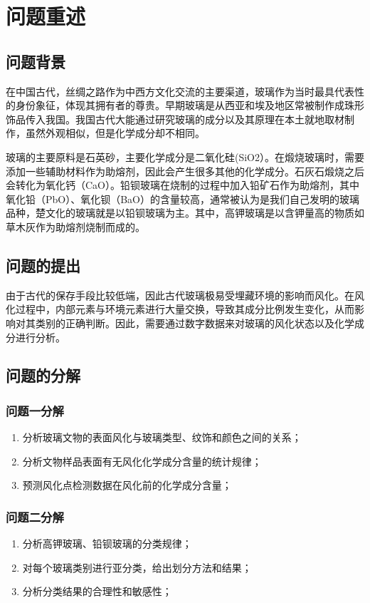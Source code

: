 \section{问题重述}
\subsection{问题背景}
在中国古代，丝绸之路作为中西方文化交流的主要渠道，玻璃作为当时最具代表性的身份象征，体现其拥有者的尊贵。早期玻璃是从西亚和埃及地区常被制作成珠形饰品传入我国。我国古代大能通过研究玻璃的成分以及其原理在本土就地取材制作，虽然外观相似，但是化学成分却不相同。

玻璃的主要原料是石英砂，主要化学成分是二氧化硅(SiO2）。在煅烧玻璃时，需要添加一些辅助材料作为助熔剂，因此会产生很多其他的化学成分。石灰石煅烧之后会转化为氧化钙（CaO）。铅钡玻璃在烧制的过程中加入铅矿石作为助熔剂，其中氧化铅（PbO）、氧化钡（BaO）的含量较高，通常被认为是我们自己发明的玻璃品种，楚文化的玻璃就是以铅钡玻璃为主。其中，高钾玻璃是以含钾量高的物质如草木灰作为助熔剂烧制而成的。

\subsection{问题的提出}
由于古代的保存手段比较低端，因此古代玻璃极易受埋藏环境的影响而风化。在风化过程中，内部元素与环境元素进行大量交换，导致其成分比例发生变化，从而影响对其类别的正确判断。因此，需要通过数字数据来对玻璃的风化状态以及化学成分进行分析。

\subsection{问题的分解}
\subsubsection{问题一分解}
\begin{enumerate}
	\item 分析玻璃文物的表面风化与玻璃类型、纹饰和颜色之间的关系；
	\item 分析文物样品表面有无风化化学成分含量的统计规律；
	\item 预测风化点检测数据在风化前的化学成分含量；
\end{enumerate}

\subsubsection{问题二分解}
\begin{enumerate}
	\item 分析高钾玻璃、铅钡玻璃的分类规律；
	\item 对每个玻璃类别进行亚分类，给出划分方法和结果；
	\item 分析分类结果的合理性和敏感性；
\end{enumerate}

